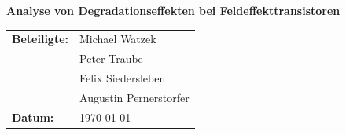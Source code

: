 \thispagestyle{empty}  %

\vspace*{2cm}

\begin{center}
{\Huge \textbf{Analyse von Degradationseffekten bei Feldeffekttransistoren}\par} %
\vspace{1cm}

\begin{tabular}{ll}
\textbf{Beteiligte:} & Michael Watzek \\
& Peter Traube \\
& Felix Siedersleben \\
& Augustin Pernerstorfer \\
\textbf{Datum:} & \today \\
\end{tabular}

\vspace{1cm}

\end{center}
